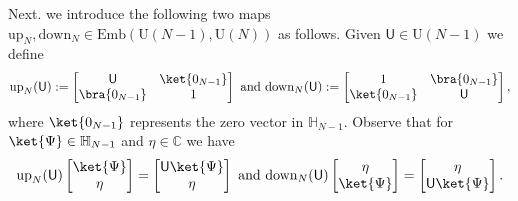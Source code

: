 \documentclass[a4paper,11pt]{article}
\newcommand{\rU}{\mathsf{U}}
\begin{document}
\begin{appendices}
  Next. we introduce the following two maps 
  $\mathrm{up}_N,\mathrm{down}_N \in \mathrm{Emb}(\mathrm{U}(N-1),\mathrm{U}(N))$
  as follows. Given $\rU \in \mathrm{U}(N-1)$ we define
  $$
  \mathrm{up}_N(\rU) := \begin{bmatrix}
    \rU & \ket{0_{N-1}} \\
    \bra{0_{N-1}} & 1
  \end{bmatrix} \text{ and } \mathrm{down}_N(\rU) := \begin{bmatrix}
    1 & \bra{0_{N-1}} \\
    \ket{0_{N-1}} & \rU
  \end{bmatrix},
  $$
  where $\ket{0_{N-1}}$ represents the zero vector in $\mathbb{H}_{N-1}.$
  Observe that for $\ket{\Psi} \in \mathbb{H}_{N-1}$ and $\eta \in \mathbb{C}$ we have 
  $$
  \mathrm{up}_N(\rU)\begin{bmatrix}
    \ket{\Psi} \\
    \eta
  \end{bmatrix} = \begin{bmatrix}
    \rU \ket{\Psi} \\
    \eta
  \end{bmatrix} \text{ and } \mathrm{down}_N(\rU)\begin{bmatrix}
    \eta \\
    \ket{\Psi}
    \end{bmatrix} = \begin{bmatrix}
      \eta \\
      \rU \ket{\Psi}
    \end{bmatrix}.
  $$
  

\end{appendices}
\end{document}
